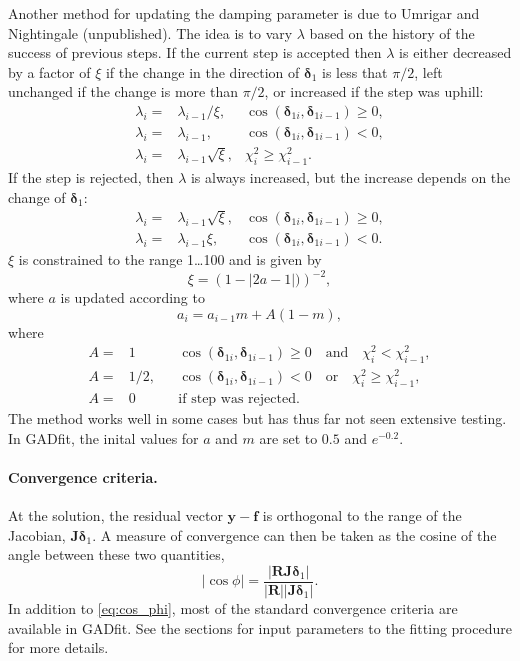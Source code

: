 \documentclass{article}
\begin{document}
Another method for updating the damping parameter is due to Umrigar and Nightingale (unpublished). The idea is to vary $\lambda$ based on the history of the success of previous steps. If the current step is accepted then $\lambda$ is either decreased by a factor of $\xi$ if the change in the direction of $\bm\delta_1$ is less that $\pi/2$, left unchanged if the change is more than $\pi/2$, or increased if the step was uphill:
\begin{align}
  \label{eq:umnigh_lambda_acc}
  \lambda_i =& \lambda_{i-1}/\xi,
  & \cos(\bm\delta_{1i},\bm\delta_{1i-1}) \ge 0, \\
  \lambda_i =& \lambda_{i-1}, & \cos(\bm\delta_{1i},\bm\delta_{1i-1})
                                < 0, \\
  \lambda_i =& \lambda_{i-1}\sqrt{\xi}, & \chi_i^2 \ge \chi_{i-1}^2.
\end{align}
If the step is rejected, then $\lambda$ is always increased, but the
increase depends on the change of $\bm\delta_1$:
\begin{align}
  \label{eq:umnigh_lambda_rej}
  \lambda_i =& \lambda_{i-1}\sqrt{\xi},
  & \cos(\bm\delta_{1i},\bm\delta_{1i-1}) \ge 0, \\
  \lambda_i =& \lambda_{i-1}\xi, & \cos(\bm\delta_{1i},\bm\delta_{1i-1})
                                   < 0.
\end{align}
$\xi$ is constrained to the range 1\ldots100 and is given by
\begin{equation}
  \label{eq:umnigh_xi}
  \xi = \left( 1-|2a-1|) \right)^{-2},
\end{equation}
where $a$ is updated according to
\begin{equation}
  \label{eq:umnigh_a_update}
  a_i = a_{i-1}m + A(1-m),
\end{equation}
where
\begin{align}
  \label{eq:umnigh_A_update}
  A =& 1 && \cos(\bm\delta_{1i},\bm\delta_{1i-1}) \ge 0 \quad
            \text{and} \quad \chi_i^2 < \chi_{i-1}^2, \\
  A =& 1/2, && \cos(\bm\delta_{1i},\bm\delta_{1i-1})
               < 0 \quad \text{or} \quad \chi_i^2 \ge \chi_{i-1}^2, \\
  A =& 0 && \text{if step was rejected}.
\end{align}
The method works well in some cases but has thus far not seen extensive testing. In GADfit, the inital values for $a$ and $m$ are set to $0.5$ and $e^{-0.2}$.

\paragraph{Convergence criteria.} At the solution, the residual vector $\bm y - \bm f$ is orthogonal to the range of the Jacobian, $\bm J\bm\delta_1$. A measure of convergence can then be taken as the cosine of the angle between these two quantities,
\begin{equation}
  \label{eq:cos_phi}
  |\cos\phi| = \frac{|\bm R \bm J\bm \delta_1|}{|\bm R||\bm J\bm \delta_1|}.
\end{equation}
In addition to \eqref{eq:cos_phi}, most of the standard convergence criteria are available in GADfit. See the sections for input parameters to the fitting procedure for more details.
\end{document}
